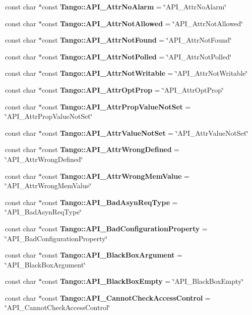\begin{DoxyCompactItemize}
\item 
const char $\ast$const {\bf Tango\-::\-A\-P\-I\-\_\-\-Attr\-No\-Alarm} = \char`\"{}A\-P\-I\-\_\-\-Attr\-No\-Alarm\char`\"{}
\item 
const char $\ast$const {\bf Tango\-::\-A\-P\-I\-\_\-\-Attr\-Not\-Allowed} = \char`\"{}A\-P\-I\-\_\-\-Attr\-Not\-Allowed\char`\"{}
\item 
const char $\ast$const {\bf Tango\-::\-A\-P\-I\-\_\-\-Attr\-Not\-Found} = \char`\"{}A\-P\-I\-\_\-\-Attr\-Not\-Found\char`\"{}
\item 
const char $\ast$const {\bf Tango\-::\-A\-P\-I\-\_\-\-Attr\-Not\-Polled} = \char`\"{}A\-P\-I\-\_\-\-Attr\-Not\-Polled\char`\"{}
\item 
const char $\ast$const {\bf Tango\-::\-A\-P\-I\-\_\-\-Attr\-Not\-Writable} = \char`\"{}A\-P\-I\-\_\-\-Attr\-Not\-Writable\char`\"{}
\item 
const char $\ast$const {\bf Tango\-::\-A\-P\-I\-\_\-\-Attr\-Opt\-Prop} = \char`\"{}A\-P\-I\-\_\-\-Attr\-Opt\-Prop\char`\"{}
\item 
const char $\ast$const {\bf Tango\-::\-A\-P\-I\-\_\-\-Attr\-Prop\-Value\-Not\-Set} = \char`\"{}A\-P\-I\-\_\-\-Attr\-Prop\-Value\-Not\-Set\char`\"{}
\item 
const char $\ast$const {\bf Tango\-::\-A\-P\-I\-\_\-\-Attr\-Value\-Not\-Set} = \char`\"{}A\-P\-I\-\_\-\-Attr\-Value\-Not\-Set\char`\"{}
\item 
const char $\ast$const {\bf Tango\-::\-A\-P\-I\-\_\-\-Attr\-Wrong\-Defined} = \char`\"{}A\-P\-I\-\_\-\-Attr\-Wrong\-Defined\char`\"{}
\item 
const char $\ast$const {\bf Tango\-::\-A\-P\-I\-\_\-\-Attr\-Wrong\-Mem\-Value} = \char`\"{}A\-P\-I\-\_\-\-Attr\-Wrong\-Mem\-Value\char`\"{}
\item 
const char $\ast$const {\bf Tango\-::\-A\-P\-I\-\_\-\-Bad\-Asyn\-Req\-Type} = \char`\"{}A\-P\-I\-\_\-\-Bad\-Asyn\-Req\-Type\char`\"{}
\item 
const char $\ast$const {\bf Tango\-::\-A\-P\-I\-\_\-\-Bad\-Configuration\-Property} = \char`\"{}A\-P\-I\-\_\-\-Bad\-Configuration\-Property\char`\"{}
\item 
const char $\ast$const {\bf Tango\-::\-A\-P\-I\-\_\-\-Black\-Box\-Argument} = \char`\"{}A\-P\-I\-\_\-\-Black\-Box\-Argument\char`\"{}
\item 
const char $\ast$const {\bf Tango\-::\-A\-P\-I\-\_\-\-Black\-Box\-Empty} = \char`\"{}A\-P\-I\-\_\-\-Black\-Box\-Empty\char`\"{}
\item 
const char $\ast$const {\bf Tango\-::\-A\-P\-I\-\_\-\-Cannot\-Check\-Access\-Control} = \char`\"{}A\-P\-I\-\_\-\-Cannot\-Check\-Access\-Control\char`\"{}

\end{DoxyCompactItemize}
